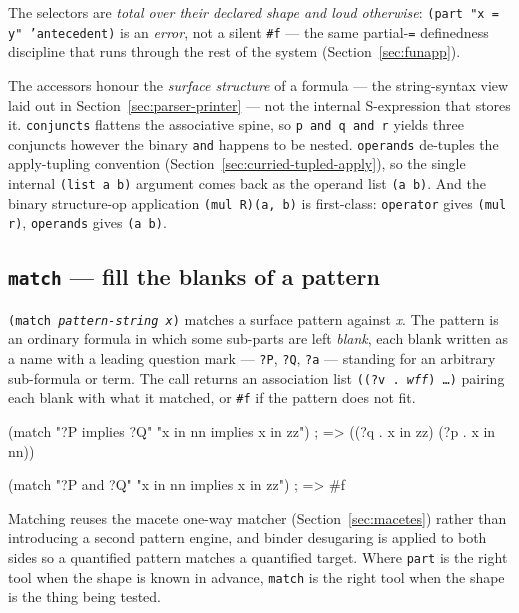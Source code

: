\noindent
The selectors are \emph{total over their declared shape and loud
otherwise}: \texttt{(part "x = y" 'antecedent)} is an \emph{error}, not a
silent \texttt{\#f} --- the same partial-\texttt{=} definedness discipline
that runs through the rest of the system (Section~\ref{sec:funapp}).

\begin{remark}
The accessors honour the \emph{surface structure} of a formula --- the
string-syntax view laid out in Section~\ref{sec:parser-printer} --- not the
internal S-expression that stores it.  \texttt{conjuncts} flattens the
associative spine, so \texttt{p and q and r} yields three conjuncts however
the binary \texttt{and} happens to be nested.  \texttt{operands} de-tuples the apply-tupling convention
(Section~\ref{sec:curried-tupled-apply}), so the single internal
\texttt{(list a b)} argument comes back as the operand list
\texttt{(a~b)}.  And the binary structure-op application \texttt{(mul
R)(a, b)} is first-class: \texttt{operator} gives \texttt{(mul r)},
\texttt{operands} gives \texttt{(a b)}.
\end{remark}

\subsection{\texttt{match} --- fill the blanks of a pattern}

\texttt{(match \textit{pattern-string} \textit{x})} matches a surface
pattern against \textit{x}.  The pattern is an ordinary formula in which
some sub-parts are left \emph{blank}, each blank written as a name with a
leading question mark --- \texttt{?P}, \texttt{?Q}, \texttt{?a} --- standing
for an arbitrary sub-formula or term.  The call returns an association list
\texttt{((?v\ .\ \textit{wff})\ \ldots)} pairing each blank with what it
matched, or \texttt{\#f} if the pattern does not fit.

\begin{VNBsnip}
(match "?P implies ?Q" "x in nn implies x in zz")
; => ((?q . x in zz) (?p . x in nn))

(match "?P and ?Q" "x in nn implies x in zz")
; => #f
\end{VNBsnip}

\noindent
Matching reuses the macete one-way matcher
(Section~\ref{sec:macetes}) rather than introducing a second pattern
engine, and binder desugaring is applied to both sides so a quantified
pattern matches a quantified target.  Where \texttt{part} is the right tool
when the shape is known in advance, \texttt{match} is the right tool when
the shape is the thing being tested.

